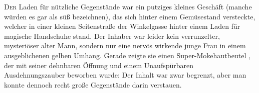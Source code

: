 \lettrine{D}{er} Laden für nützliche Gegenstände war ein putziges kleines Geschäft (manche würden es gar als süß bezeichnen), das sich hinter einem Gemüsestand versteckte, welcher in einer kleinen Seitenstraße der Winkelgasse hinter einem Laden für magische Handschuhe stand. Der Inhaber war leider kein verrunzelter, mysteriöser alter Mann, sondern nur eine nervös wirkende junge Frau in einem ausgeblichenen gelben Umhang. Gerade zeigte sie einen Super-Mokehautbeutel , der mit seiner dehnbaren Öffnung und einem Unaufspürbaren Ausdehnungszauber beworben wurde: Der Inhalt war zwar begrenzt, aber man konnte dennoch recht große Gegenstände darin verstauen.

